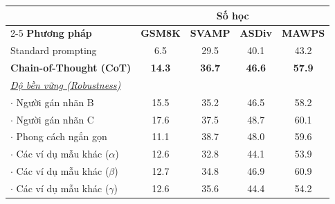 \begin{tabular}{l c c c c}
    \toprule
    & \multicolumn{4}{c}{\textbf{Số học}} \\
    \cmidrule(lr){2-5}
    \textbf{Phương pháp} & \textbf{GSM8K} & \textbf{SVAMP} & \textbf{ASDiv} & \textbf{MAWPS} \\
    \midrule 
    Standard prompting & 6.5 & 29.5 & 40.1 & 43.2 \\ 
    \textbf{Chain-of-Thought (CoT)} & \textbf{14.3} & \textbf{36.7} & \textbf{46.6} & \textbf{57.9} \\
    \midrule
    \textit{\underline{Độ bền vững (Robustness)}} & & & & \\
    $\cdot$ Người gán nhãn B & 15.5 & 35.2 & 46.5 & 58.2 \\
    $\cdot$ Người gán nhãn C & 17.6 & 37.5 & 48.7 & 60.1 \\
    $\cdot$ Phong cách ngắn gọn & 11.1 & 38.7 & 48.0 & 59.6 \\
    $\cdot$ Các ví dụ mẫu khác ($\alpha$) & 12.6 & 32.8 & 44.1 & 53.9 \\
    $\cdot$ Các ví dụ mẫu khác ($\beta$) & 12.7 & 34.8 & 46.9 & 60.9 \\
    $\cdot$ Các ví dụ mẫu khác ($\gamma$) & 12.6 & 35.6 & 44.4 & 54.2 \\
    \bottomrule
\end{tabular}